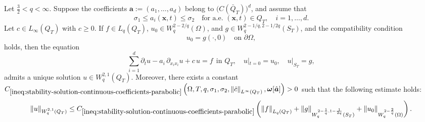 \documentclass[final,onefignum,onetabnum]{mousaviart}
\begin{document}
	\begin{theorem}
		\label{lem:well-posedness-linear-equation-smooth-coefficients-parabolic}
		Let $\frac{3}{2}<q< \infty$. Suppose the coefficients $\boldsymbol{a} := (a_1,\dots, a_d)$ belong to
		$\bigl(C(\bar{Q}_T)\bigr)^d$, and assume that 
		\[
		\sigma_1 \le a_i(\boldsymbol{x}, t) \le \sigma_2
		\quad \text{for a.e.\ } (\boldsymbol{x}, t) \in Q_T,\quad i = 1,\dots,d.
		\]
		Let $ c \in L_{\infty}(Q_T)$
		with $ c \ge 0$.
		If $f \in L_q(Q_T)$, 
		$ u_0 \in W^{2-2/q}_q(\Omega)$, and $g \in W^{2-1/q, 2-1/{2q}}_q(S_T) $, and the compatibility condition 
		\[
		u_{0} = g(\cdot, 0) \quad \text{on }
		\partial \Omega,
		\]
		holds, then the equation
		\begin{equation}
			\label{eq:-linear-system-smooth-coefficients-parabolic}
			\sum_{i=1}^{d}
			\partial_t u -
			a_i\, \partial_{x_i x_i} u
			+
			c\, u
			=
			f
			~~ \text{in } Q_T,
			\quad
			u |_{t=0} = u_{0},
			\quad
			u |_{S_T} = g ,
		\end{equation}
		admits a unique solution
		$u \in W^{2,1}_q(Q_T)$.
		Moreover, there exists a constant \\$	C_{\ref{ineq:stability-solution-continuous-coefficients-parabolic}}
		\left( \Omega, T, q, \sigma_1, \sigma_2, \left\| \hat{c} \right\|_{L^{\infty}(Q_T)},
		\boldsymbol{\omega}[\hat{\boldsymbol{a}}] \right) >0 $ such that the following estimate holds:
		\begin{equation}
			\label{ineq:stability-solution-continuous-coefficients-parabolic}
			\left\| u \right\|_{W^{2,1}_q(Q_T)}
			\le
			C_{\ref{ineq:stability-solution-continuous-coefficients-parabolic}}
			\left(
			\left\| f \right\|_{L_q(Q_T)}
			+
			\left\| g \right\|_{W^{2-\frac{1}{q},1- \frac{1}{2q}}_q(S_T)}
			+
			\left\| u_0 \right\|_{W^{2-\frac{2}{q}}_q(\Omega)} 
			\right).
		\end{equation}
	\end{theorem}
\end{document}
